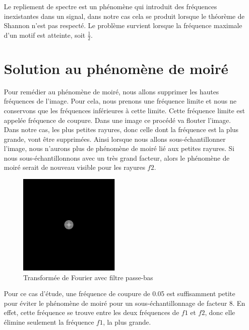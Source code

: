 \documentclass[a4paper,11pt]{article}
\begin{document}
  Le repliement de spectre est un phénomène qui introduit des fréquences inexistantes dans un signal, dans notre cas cela se produit lorsque le théorème de Shannon n’est pas respecté.
  Le problème survient lorsque la fréquence maximale d’un motif est atteinte, soit $\frac{1}{2}$.\\

  \newpage
  
  \section{Solution au phénomène de moiré}
  
  Pour remédier au phénomène de moiré, nous allons supprimer les hautes fréquences 
  de l'image. Pour cela, nous prenons une fréquence limite et nous ne conservons 
  que les fréquences inférieures à cette limite. Cette fréquence limite est 
  appelée fréquence de coupure. Dans une image ce procédé va flouter l'image. 
  Dans notre cas, les plus petites rayures, donc celle dont la fréquence est la plus grande,
  vont être supprimées. Ainsi lorsque nous allons sous-échantillonner l'image, nous n'aurons plus de phénomène
  de moiré lié aux petites rayures. Si nous sous-échantillonnons avec un très grand facteur, alors le phénomène 
  de moiré serait de nouveau visible pour les rayures $f2$.\\
  
  \begin{figure}[H]
  \centering
   \includegraphics[width=5cm]{../FFT_1024_moire.png}
   \caption{Transformée de Fourier avec filtre passe-bas}
  \end{figure}
  
  Pour ce cas d'étude, une fréquence de coupure de 0.05 est suffisamment petite 
  pour éviter le phénomène de moiré pour un sous-échantillonnage de facteur 8. 
  En effet, cette fréquence se trouve entre les deux fréquences de $f1$ et $f2$, donc 
  elle élimine seulement la fréquence $f1$, la plus grande.\\
  
\end{document}
